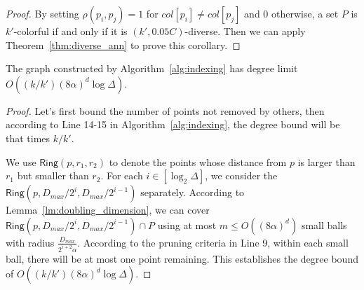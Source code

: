 \begin{proof} 
By setting $\rho(p_i,p_j)=1$ for $col[p_i]\neq col[p_j]$ and $0$ otherwise, a set $P$ is $k'$-colorful if and only if it is $(k',0.05C)$-diverse. Then we can apply Theorem~\ref{thm:diverse_ann} to prove this corollary.
\end{proof}
\fi

\begin{lemma}\label{lm:degree_diverse}
The graph constructed by Algorithm~\ref{alg:indexing} has degree limit $O((k/k')(8\alpha)^d\log\Delta)$.
\end{lemma}

\begin{proof}
Let's first bound the number of points not removed by others, then according to Line 14-15 in Algorithm~\ref{alg:indexing}, the degree bound will be that times $k/k'$.

We use $\mathsf{Ring}(p,r_1,r_2)$ to denote the points whose distance from $p$ is larger than $r_1$ but smaller than $r_2$. For each $i\in [\log_2 \Delta]$, we consider the $\mathsf{Ring}(p,D_{max}/2^i,D_{max}/2^{i-1})$ separately. According to Lemma~\ref{lm:doubling_dimension}, we can cover $\mathsf{Ring}(p,D_{max}/2^i,D_{max}/2^{i-1})\cap P$ using at most $m\le O((8\alpha)^d)$ small balls with radius $\frac{D_{max}}{2^{i+2}\alpha}$. According to the pruning criteria in Line 9, within each small ball, there will be at most one point remaining. This establishes the degree bound of $O((k/k')(8\alpha)^d\log\Delta)$.
\end{proof}

